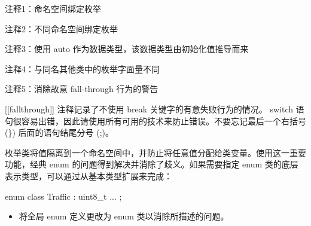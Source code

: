 {\footnotesize
注释1：命名空间绑定枚举

注释2：不同命名空间绑定枚举

注释3：使用 auto 作为数据类型，该数据类型由初始化值推导而来

注释4：与同名其他类中的枚举字面量不同

注释5：消除故意 fall-through 行为的警告
}

[[fallthrough]] 注释记录了不使用 break 关键字的有意失败行为的情况。 switch 语句很容易出错，因此请使用所有可用的技术来防止错误。不要忘记最后一个右括号 (\}) 后面的语句结尾分号 (;)。

枚举类将值隔离到一个命名空间中，并防止将任意值分配给类变量。使用这一重要功能，经典 enum 的问题得到解决并消除了歧义。如果需要指定 enum 类的底层表示类型，可以通过从基本类型扩展来完成：

\begin{cpp}
enum class Traffic : uint8_t {
  ...
};
\end{cpp}


\begin{itemize}
\item
将全局 enum 定义更改为 enum 类以消除所描述的问题。
\end{itemize}
